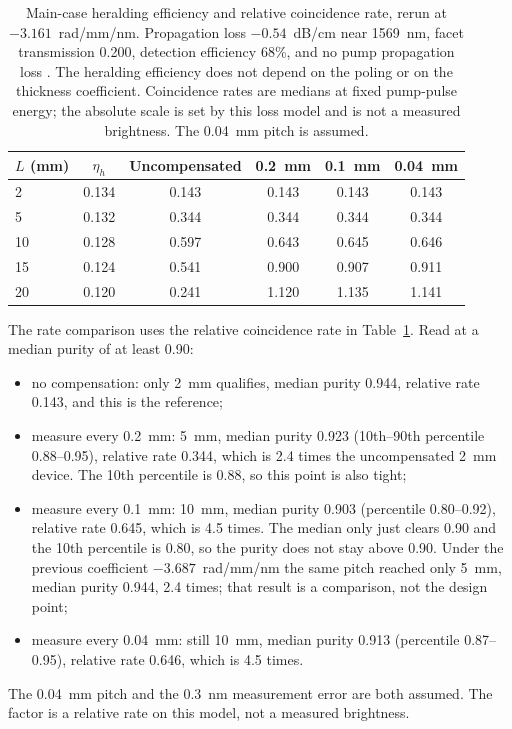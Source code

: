\documentclass[11pt,a4paper]{article}
\begin{document}
\begin{table}[t]
\centering
\caption{Main-case heralding efficiency and relative coincidence rate, rerun at $-3.161$~rad/mm/nm.
Propagation loss $-0.54$~dB/cm near 1569~nm, facet transmission 0.200, detection efficiency 68\%, and no pump propagation loss \cite{Zhao2020}.
The heralding efficiency does not depend on the poling or on the thickness coefficient.
Coincidence rates are medians at fixed pump-pulse energy; the absolute scale is set by this loss model and is not a measured brightness.
The 0.04~mm pitch is assumed.}
\label{tab:rate}
\begin{tabular}{lccccc}
\toprule
$L$ (mm) & $\eta_{h}$ & Uncompensated & 0.2~mm & 0.1~mm & 0.04~mm \\
\midrule
2  & 0.134 & 0.143 & 0.143 & 0.143 & 0.143 \\
5  & 0.132 & 0.344 & 0.344 & 0.344 & 0.344 \\
10 & 0.128 & 0.597 & 0.643 & 0.645 & 0.646 \\
15 & 0.124 & 0.541 & 0.900 & 0.907 & 0.911 \\
20 & 0.120 & 0.241 & 1.120 & 1.135 & 1.141 \\
\bottomrule
\end{tabular}
\end{table}

The rate comparison uses the relative coincidence rate in Table~\ref{tab:rate}.
Read at a median purity of at least 0.90:
\begin{itemize}
\item no compensation: only 2~mm qualifies, median purity 0.944, relative rate 0.143, and this is the reference;
\item measure every 0.2~mm: 5~mm, median purity 0.923 (10th--90th percentile 0.88--0.95), relative rate 0.344, which is 2.4 times the uncompensated 2~mm device.
The 10th percentile is 0.88, so this point is also tight;
\item measure every 0.1~mm: 10~mm, median purity 0.903 (percentile 0.80--0.92), relative rate 0.645, which is 4.5 times.
The median only just clears 0.90 and the 10th percentile is 0.80, so the purity does not stay above 0.90.
Under the previous coefficient $-3.687$~rad/mm/nm the same pitch reached only 5~mm, median purity 0.944, 2.4 times; that result is a comparison, not the design point;
\item measure every 0.04~mm: still 10~mm, median purity 0.913 (percentile 0.87--0.95), relative rate 0.646, which is 4.5 times.
\end{itemize}
The 0.04~mm pitch and the 0.3~nm measurement error are both assumed.
The factor is a relative rate on this model, not a measured brightness.
\end{document}
